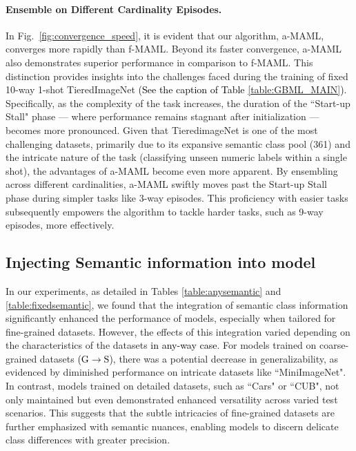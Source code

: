 \documentclass[letterpaper]{article} %
\newcommand{\nj}[1]{\textcolor{black}{#1}}
\newcommand{\jh}[1]{\textcolor{black}{#1}}
\begin{document}
\paragraph{Ensemble on Different Cardinality Episodes.}
In Fig.~\ref{fig:convergence_speed}, it is evident that our algorithm, a-MAML, converges more rapidly than f-MAML. Beyond its faster convergence, a-MAML also demonstrates superior performance in comparison to f-MAML. This distinction provides insights into the challenges faced during the  training of fixed 10-way 1-shot TieredImageNet \nj{(See the caption of Table \ref{table:GBML_MAIN})}. Specifically, as the complexity of the task increases, the duration of the ``Start-up Stall" phase — where performance remains stagnant after initialization — becomes more pronounced. Given that TieredimageNet is one of the most challenging datasets, primarily due to its expansive semantic class pool (361) and the intricate nature of the task (classifying unseen numeric labels within a single shot), the advantages of a-MAML become even more apparent. By ensembling across different cardinalities, a-MAML swiftly moves past the Start-up Stall phase during simpler tasks like 3-way episodes. This proficiency with easier tasks subsequently empowers the algorithm to tackle harder tasks, such as 9-way episodes, more effectively.

\subsection{Injecting  Semantic information into model}
In our experiments, as detailed in Tables \ref{table:anysemantic} and \ref{table:fixedsemantic}, we found that the integration of semantic class information significantly enhanced the performance of models, especially when tailored for fine-grained datasets. However, the effects of this integration varied depending on the characteristics of the datasets \jh{in any-way case}. %
For models trained on coarse-grained datasets \nj{(G$\rightarrow$S)}, there was a potential decrease in generalizability, as evidenced by diminished performance on intricate datasets like ``MiniImageNet". In contrast, models trained on detailed datasets, such as ``Cars" or ``CUB", not only maintained but even demonstrated enhanced versatility across varied test scenarios. This suggests that the subtle intricacies %
of fine-grained datasets are further emphasized %
with semantic nuances, enabling models to discern delicate %
class differences with greater precision.
\end{document}
